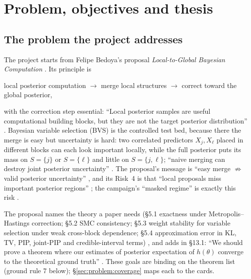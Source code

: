 \section{Problem, objectives and thesis}\label{sec:problem}

\subsection{The problem the project addresses}\label{sec:problem:what}

The project starts from Felipe Bedoya's proposal \emph{Local-to-Global Bayesian Computation} . Its principle is
\begin{center}
local posterior computation $\longrightarrow$ merge local structures $\longrightarrow$ correct toward the global posterior,
\end{center}
with the correction step essential: ``Local posterior samples are useful computational building blocks, but they are not the target posterior distribution'' . Bayesian variable selection (BVS) is the controlled test bed, because there the merge is easy but uncertainty is hard: two correlated predictors $X_j, X_\ell$ placed in different blocks can each look important locally, while the full posterior puts its mass on $S=\{j\}$ or $S=\{\ell\}$ and little on $S=\{j,\ell\}$; ``naive merging can destroy joint posterior uncertainty'' . The proposal's message is ``easy merge $\not\Rightarrow$ valid posterior uncertainty'' , and its Risk~4 is that ``local proposals miss important posterior regions'' ; the campaign's ``masked regime'' is exactly this risk .

The proposal names the theory a paper needs (§5.1 exactness under Metropolis--Hastings correction; §5.2 SMC consistency; §5.3 weight stability for variable selection under weak cross-block dependence; §5.4 approximation error in KL, TV, PIP, joint-PIP and credible-interval terms) , and adds in §13.1: ``We should prove a theorem where our estimates of posterior expectation of $h(\theta)$ converge to the theoretical ground truth'' . These goals are binding on the theorem list (ground rule 7 below); \S\ref{sec:problem:coverage} maps each to the cards.

